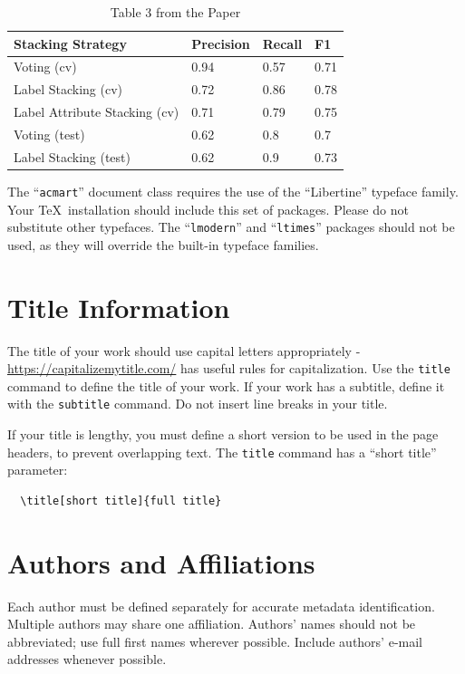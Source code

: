 \documentclass[sigconf]{acmart}
\begin{document}
\begin{table}[]
\caption*{Table 3 from the Paper}
\begin{tabular}{llll}
\hline
Stacking Strategy             & Precision & Recall & F1   \\ \hline
Voting (cv)                   & 0.94      & 0.57   & 0.71 \\
Label Stacking (cv)           & 0.72      & 0.86   & 0.78 \\
Label Attribute Stacking (cv) & 0.71      & 0.79   & 0.75 \\
Voting (test)                 & 0.62      & 0.8    & 0.7  \\
Label Stacking (test)         & 0.62      & 0.9    & 0.73 \\ \hline
\end{tabular}
\end{table}

The ``\verb|acmart|'' document class requires the use of the
``Libertine'' typeface family. Your \TeX\ installation should include
this set of packages. Please do not substitute other typefaces. The
``\verb|lmodern|'' and ``\verb|ltimes|'' packages should not be used,
as they will override the built-in typeface families.

\section{Title Information}

The title of your work should use capital letters appropriately -
\url{https://capitalizemytitle.com/} has useful rules for
capitalization. Use the {\verb|title|} command to define the title of
your work. If your work has a subtitle, define it with the
{\verb|subtitle|} command.  Do not insert line breaks in your title.

If your title is lengthy, you must define a short version to be used
in the page headers, to prevent overlapping text. The \verb|title|
command has a ``short title'' parameter:
\begin{verbatim}
  \title[short title]{full title}
\end{verbatim}

\section{Authors and Affiliations}

Each author must be defined separately for accurate metadata
identification. Multiple authors may share one affiliation. Authors'
names should not be abbreviated; use full first names wherever
possible. Include authors' e-mail addresses whenever possible.
\end{document}
